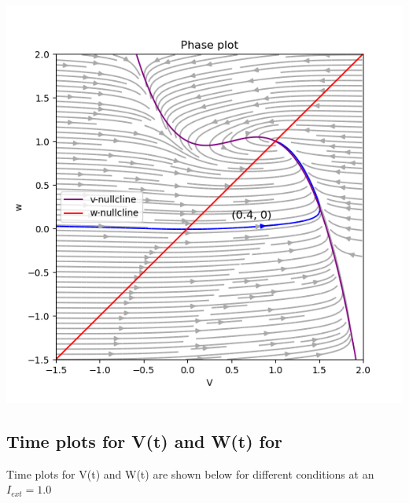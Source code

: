 \documentclass[a4paper, 12pt]{article}
\begin{document}
\begin{minipage}{0.48\linewidth}
    \centering
    \includegraphics[width=\textwidth]{Q3_b}
    \label{fig:Q3_b}
\end{minipage}

\vspace{2em}
\subsection{Time plots for V(t) and W(t) for  }

Time plots for V(t) and W(t) are shown below for different conditions at an $ I_{ext} = 1.0 $ 

\subsubsection{}
\end{document}
